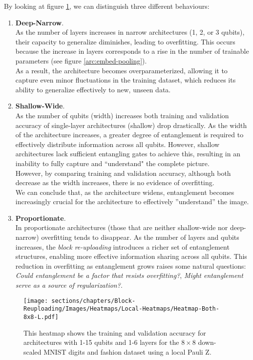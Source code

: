 
By looking at figure \ref{fig:heatmap-8x8-L}, we can distinguish 
three different behaviours:

\begin{enumerate}
    \item \textbf{Deep-Narrow}.\\
    As the number of layers increases in narrow architectures (1, 2, or 3 qubits), their capacity to 
    generalize diminishes, leading to overfitting. This occurs because the increase in layers corresponds 
    to a rise in the number of trainable parameters (see figure \ref{arc:embed-pooling}).\\
    As a result, the architecture becomes overparameterized, allowing it to capture even minor 
    fluctuations in the training dataset, which reduces its ability to generalize effectively to new, 
    unseen data.
    \item \textbf{Shallow-Wide}.\\
    As the number of qubits (width) increases both training and validation accuracy of 
    single-layer architectures (shallow) drop drastically.
    As the width of the architecture increases, a greater degree of entanglement is required to 
    effectively distribute information across all qubits. However, shallow architectures lack 
    sufficient entangling gates to achieve this, resulting in an inability to fully capture and 
    “understand" the complete picture.\\
    However, by comparing training and validation accuracy, although both decrease as 
    the width increases, there is no evidence of overfitting.\\
    We can conclude that, as the architecture widens, entanglement becomes increasingly crucial for the 
    architecture to effectively ”understand” the image.
    \item \textbf{Proportionate}.\\
    In proportionate architectures (those that are neither shallow-wide nor deep-narrow) overfitting 
    tends to disappear. As the number of layers and qubits increases, the \textit{block re-uploading} 
    introduces a richer set of entanglement structures, enabling more effective information sharing 
    across all qubits. This reduction in overfitting as entanglement grows raises some natural questions:
    \textit{Could entanglement be a factor that resists overfitting?}, 
    \textit{Might entanglement serve as a source of regularization?}.
\end{enumerate}


\begin{figure}[h]
    \centering
    \texttt{[image: sections/chapters/Block-Reuploading/Images/Heatmaps/Local-Heatmaps/Heatmap-Both-8x8-L.pdf]}
    \caption{This heatmap shows the training and validation accuracy for architectures with 1-15 qubits and
    1-6 layers for the $8\times8$ down-scaled MNIST digits and fashion dataset using a local Pauli Z.}
    \label{fig:heatmap-8x8-L}
\end{figure}
